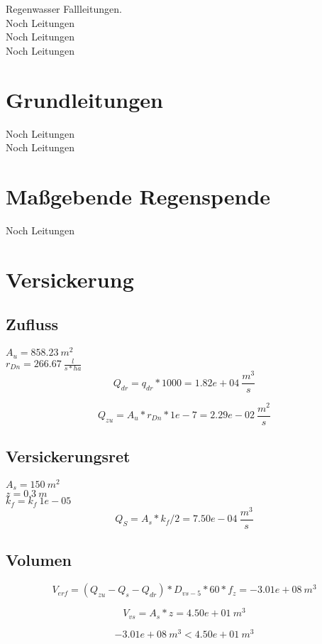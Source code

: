 \documentclass[12pt]{report}
\begin{document}
Regenwasser Fallleitungen.\\
Noch Leitungen\\
Noch Leitungen\\
Noch Leitungen\\

\section*{Grundleitungen}

Noch Leitungen\\
Noch Leitungen\\

\section*{Maßgebende Regenspende}

Noch Leitungen\\

\section*{Versickerung}

\subsection*{Zufluss}

$A_{u} = 858.23 \ m^2$ \\
$r_{Dn} = 266.67 \ \frac{l}{s*ha}$ \\

\begin{equation}
        Q_{dr} = q_{dr} * 1000 = 1.82e+04 \ \frac{m^3}{s}
\end{equation}

\begin{equation}
        Q_{zu} = A_{u} * r_{Dn} * 1e-7 = 2.29e-02 \ \frac{m^2}{s}
\end{equation}

\subsection*{Versickerungsret}

$A_{s} = 150 \ m^2$ \\
$z = 0.3 \ m$ \\
$k_f = k_{f} \ 1e-05$ \\

\begin{equation}
        Q_S = A_s * k_f / 2 = 7.50e-04 \ \frac{m^3}{s}
\end{equation}

\subsection*{Volumen}

\begin{equation}
        V_{erf} = (Q_{zu} - Q_{s} - Q_{dr}) * D_{vs-5} * 60 * f_{z} = -3.01e+08 \ m^3
\end{equation}

\begin{equation}
        V_{vs} = A_{s} * z = 4.50e+01 \ m^3
\end{equation}

\begin{equation}
        -3.01e+08 \ m^3 < 4.50e+01 \ m^3
\end{equation}
\end{document}
